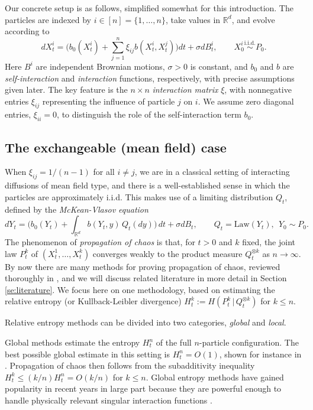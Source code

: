 \documentclass[11pt,reqno]{amsart}
\numberwithin{equation}{section}
\theoremstyle{definition}
\def\R{{\mathbb R}}
\begin{document}
Our concrete setup is as follows, simplified somewhat for this introduction. The particles are indexed by $i \in [n]=\{1,\ldots,n\}$, take values in $\R^d$, and evolve according to
\begin{equation}
dX^i_t = \Big(b_0(X^i_t) +  \sum_{j=1}^n \xi_{ij} b(X^i_t,X^j_t)\Big)dt + \sigma dB^i_t, \qquad X^i_0 \stackrel{\text{i.i.d.}}{\sim}  P_0. \label{intro:SDE-n}
\end{equation}
Here $B^i$ are independent Brownian motions, $\sigma > 0$ is constant, and $b_0$ and $b$ are \emph{self-interaction} and \emph{interaction} functions, respectively, with precise assumptions given later.
The key feature is the $n \times n$ \emph{interaction matrix} $\xi$, with nonnegative entries $\xi_{ij}$ representing the influence of particle $j$ on $i$. We assume zero diagonal entries, $\xi_{ii}=0$, to distinguish the role of the self-interaction term $b_0$. 


\subsection{The exchangeable (mean field) case}
When $\xi_{ij}=1/(n-1)$ for all $i \neq j$, we are in a classical setting of interacting diffusions of mean field type, and there is a well-established sense in which the particles are approximately i.i.d. This makes use of a limiting distribution $Q_t$, defined by the \emph{McKean-Vlasov equation}
\begin{equation}
dY_t = \bigg(b_0(Y_t) + \int_{\R^d} b(Y_t,y)\,Q_t(dy)\bigg)\,dt + \sigma dB_t, \qquad Q_t=\mathrm{Law}(Y_t), \ \ Y_0 \sim P_0. \label{intro:SDE-MV-MFcase}
\end{equation}
The phenomenon of \emph{propagation of chaos} is that, for $t > 0$ and $k$ fixed, the joint law $P^k_t$ of $(X^1_t,\ldots,X^k_t)$ converges weakly to the product measure $Q_t^{\otimes k}$ as $n\to\infty$.
By now there are many methods for proving propagation of chaos, reviewed thoroughly in \cite{chaintron2021propagation,chaintron2022propagation}, and we will discuss related literature in more detail in Section \ref{se:literature}. We focus here on one methodology, based on estimating the relative entropy (or Kullback-Leibler divergence) $H^k_t := H(P^k_t\,|\,Q_t^{\otimes k})$ for $k \le n$.

Relative entropy methods can be divided into two categories, \emph{global} and \emph{local}. 

Global methods estimate the entropy $H^n_t$ of the full $n$-particle configuration. The best possible global estimate in this setting is $H^n_t = O(1)$, shown for instance in \cite{jabin2016mean,jabin2018quantitative,jabir2019rate}. Propagation of chaos then follows from the subadditivity inequality $H^k_t\le (k/n)H^n_t = O(k/n)$ for $k \le n$. Global entropy methods have gained popularity in recent years in large part because they are powerful enough to handle physically relevant singular interaction functions \cite{jabin2018quantitative}.
\end{document}
